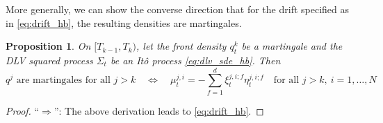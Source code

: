 \documentclass[11pt]{article}
\theoremstyle{plain}
\newtheorem{proposition}[theorem]{Proposition}
\theoremstyle{definition}
\theoremstyle{remark}
\begin{document}
  More generally, we can show the converse direction that for the drift specified as in \eqref{eq:drift_hb}, the resulting densities are martingales.
  \begin{proposition}
    On $[T_{k-1}, T_k)$, let the front density $q^k_t$ be a martingale and the DLV squared process $\Sigma_t$ be an Itô process \eqref{eq:dlv_sde_hb}. Then 
    \begin{equation*}
      q^{j} \textrm{ are martingales for all } j > k 
        \quad \Longleftrightarrow \quad 
        \mu_t^{j,i}
        =-\sum_{f=1}^d\xi_t^{j,i;f}\eta_t^{j,i;f}
        \quad \textrm{for all } j > k,\ i = 1, \dots, N
    \end{equation*}
  \end{proposition}
  \begin{proof}
    ``$\Rightarrow$'': The above derivation leads to \eqref{eq:drift_hb}. 
    

\end{proof}
\end{document}
